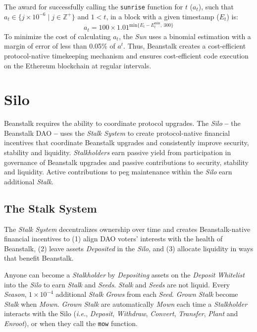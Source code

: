 \documentclass[tikz]{article}
\newcommand{\code}[1]{\texttt{#1}}
\newcommand{\term}[1]{\textsl{#1}}
\begin{document}
The award for successfully calling the \code{sunrise} function for $t$ ($a_t$), such that $a_t \in \{j \times 10^{-6} \mid j \in \mathbb{Z}^{+} \}$ and $1 < t$, in a block with a given timestamp ($E_t$) is:
$$a_t = 100 \times 1.01^{\text{min}\{{E_t - E_{t}^{\text{min}}},\ 300\}}$$
To minimize the cost of calculating $a_t$, the \term{Sun} uses a binomial estimation with a margin of error of less than 0.05\% of $a^t$. Thus, Beanstalk creates a cost-efficient protocol-native timekeeping mechanism and ensures cost-efficient code execution on the Ethereum blockchain at regular intervals.

\section{Silo}
Beanstalk requires the ability to coordinate protocol upgrades. The \term{Silo} \textbf{--} the Beanstalk DAO \textbf{--} uses the \term{Stalk System} to create protocol-native financial incentives that coordinate Beanstalk upgrades and consistently improve security, stability and liquidity. \term{Stalkholders} earn passive yield from participation in governance of Beanstalk upgrades and passive contributions to security, stability and liquidity. Active contributions to peg maintenance within the \term{Silo} earn additional \term{Stalk}.

\subsection{The Stalk System}
The \term{Stalk System} decentralizes ownership over time and creates Beanstalk-native financial incentives to (1) align DAO voters' interests with the health of Beanstalk, (2) leave assets \term{Deposited} in the \term{Silo}, and (3) allocate liquidity in ways that benefit Beanstalk.

Anyone can become a \term{Stalkholder} by \term{Depositing} assets on the \term{Deposit} \term{Whitelist} into the \term{Silo} to earn \term{Stalk} and \term{Seeds}. \term{Stalk} and \term{Seeds} are not liquid. Every \term{Season}, $1 \times 10^{-4}$ additional \term{Stalk} \term{Grows} from each \term{Seed}. \term{Grown} \term{Stalk} become \term{Stalk} when \term{Mown}. \term{Grown} \term{Stalk} are automatically \term{Mown} each time a \term{Stalkholder} interacts with the Silo (\term{i.e.}, \term{Deposit}, \term{Withdraw}, \term{Convert}, \term{Transfer}, \term{Plant} and \term{Enroot}), or when they call the \code{mow} function.
\end{document}
